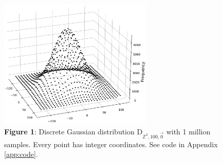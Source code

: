 \begin{figure}
    \centering
    \hypertarget{fig:discrete-gauss}{}
    \includegraphics[width=0.65\textwidth]{figures/D-G-2d-a_is_100-n_1000000.pdf}
    \caption*{\textbf{Figure 1}: Discrete Gaussian distribution $\textrm{D}_{\mathbb{Z}^2, 100, \vec{0}}$ with 1 million samples. Every point has integer coordinates. See code in Appendix \ref{app:code}.}
\end{figure}
